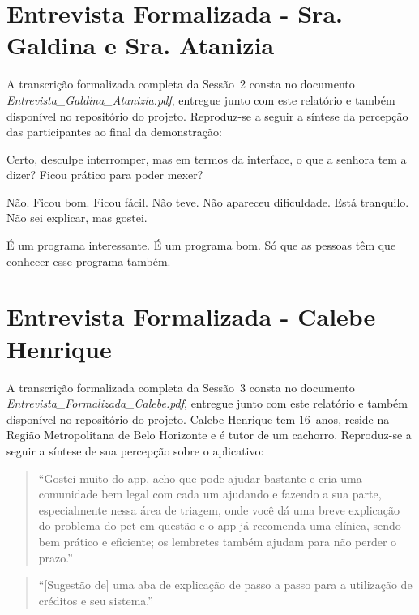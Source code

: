 \documentclass[
    12pt,
    openright,
    oneside,
    a4paper
]{abntex2}
\newenvironment{turnos}
  {\begin{list}{}{%
     \setlength{\leftmargin}{2.2cm}%
     \setlength{\labelwidth}{2.0cm}%
     \setlength{\labelsep}{0.2cm}%
     \setlength{\itemsep}{0.45em}%
     \setlength{\parsep}{0pt}}}
  {\end{list}}
\newcommand{\fala}[1]{\item[\textbf{#1}\hfill]}
\begin{document}
\chapter{Entrevista Formalizada - Sra. Galdina e Sra. Atanizia}
\label{apx:galdina}

\begin{sloppypar}
A transcrição formalizada completa da Sessão~2 consta no documento
\textit{Entrevista\_Galdina\_Atanizia.pdf}, entregue junto com este relatório e também
disponível no repositório do projeto. Reproduz-se a seguir a síntese da percepção das
participantes ao final da demonstração:
\end{sloppypar}

\begin{turnos}
\fala{E:} Certo, desculpe interromper, mas em termos da interface, o que a senhora tem a
dizer? Ficou prático para poder mexer?
\fala{G:} Não. Ficou bom. Ficou fácil. Não teve. Não apareceu dificuldade. Está tranquilo.
Não sei explicar, mas gostei.
\fala{G:} É um programa interessante. É um programa bom. Só que as pessoas têm que conhecer
esse programa também.
\end{turnos}

\chapter{Entrevista Formalizada - Calebe Henrique}
\label{apx:calebe}

\begin{sloppypar}
A transcrição formalizada completa da Sessão~3 consta no documento
\textit{Entrevista\_Formalizada\_Calebe.pdf}, entregue junto com este relatório e também
disponível no repositório do projeto. Calebe Henrique tem 16~anos, reside na Região
Metropolitana de Belo Horizonte e é tutor de um cachorro. Reproduz-se a seguir a síntese de
sua percepção sobre o aplicativo:
\end{sloppypar}

\begin{quote}
\enquote{Gostei muito do app, acho que pode ajudar bastante e cria uma comunidade bem legal
com cada um ajudando e fazendo a sua parte, especialmente nessa área de triagem, onde você dá
uma breve explicação do problema do pet em questão e o app já recomenda uma clínica, sendo
bem prático e eficiente; os lembretes também ajudam para não perder o prazo.}
\end{quote}
\begin{quote}
\enquote{[Sugestão de] uma aba de explicação de passo a passo para a utilização de créditos e
seu sistema.}
\end{quote}
\end{document}
